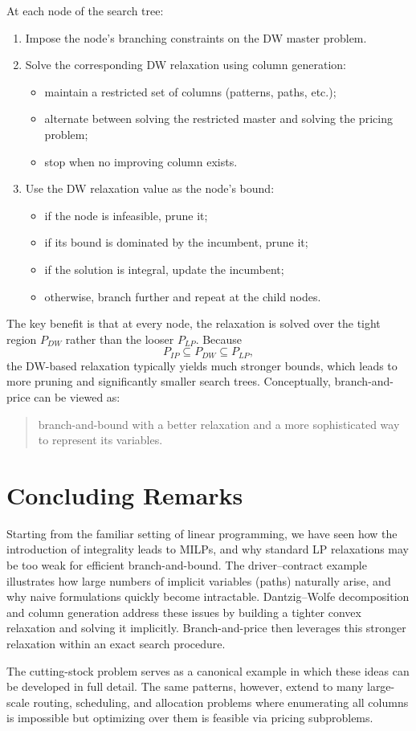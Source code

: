 \documentclass[11pt]{article}
\begin{document}
At each node of the search tree:
\begin{enumerate}
    \item Impose the node's branching constraints on the DW master problem.
    \item Solve the corresponding DW relaxation using column generation:
    \begin{itemize}
        \item maintain a restricted set of columns (patterns, paths, etc.);
        \item alternate between solving the restricted master and solving
              the pricing problem;
        \item stop when no improving column exists.
    \end{itemize}
    \item Use the DW relaxation value as the node's bound:
    \begin{itemize}
        \item if the node is infeasible, prune it;
        \item if its bound is dominated by the incumbent, prune it;
        \item if the solution is integral, update the incumbent;
        \item otherwise, branch further and repeat at the child nodes.
    \end{itemize}
\end{enumerate}

The key benefit is that at every node, the relaxation is solved over the tight
region $P_{DW}$ rather than the looser $P_{LP}$.
Because
\[
    P_{IP} \subseteq P_{DW} \subseteq P_{LP},
\]
the DW-based relaxation typically yields much stronger bounds, which leads to
more pruning and significantly smaller search trees.
Conceptually, branch-and-price can be viewed as:
\begin{quote}
    branch-and-bound with a better relaxation and a more sophisticated way
    to represent its variables.
\end{quote}

\section{Concluding Remarks}

Starting from the familiar setting of linear programming, we have seen how the
introduction of integrality leads to MILPs, and why standard LP relaxations
may be too weak for efficient branch-and-bound.
The driver--contract example illustrates how large numbers of implicit
variables (paths) naturally arise, and why naive formulations quickly become
intractable.
Dantzig--Wolfe decomposition and column generation address these issues by
building a tighter convex relaxation and solving it implicitly.
Branch-and-price then leverages this stronger relaxation within an exact
search procedure.

The cutting-stock problem serves as a canonical example in which these ideas
can be developed in full detail.
The same patterns, however, extend to many large-scale routing, scheduling,
and allocation problems where enumerating all columns is impossible but
optimizing over them is feasible via pricing subproblems.
\end{document}
